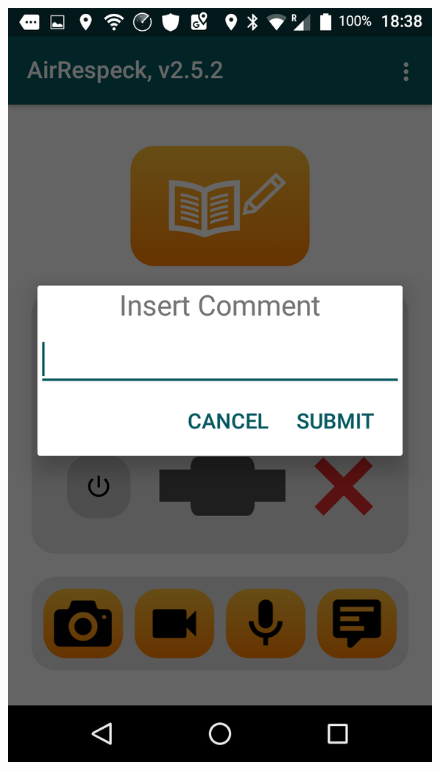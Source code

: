 \begin{figure}[H]
\begin{minipage}[b]{0.33\linewidth}
    \includegraphics[width=.8\linewidth]{images/text} 
    \vspace{3ex}
  \end{minipage}%
  \begin{minipage}[b]{0.33\linewidth}
    \centering

\end{minipage}
\end{figure}
